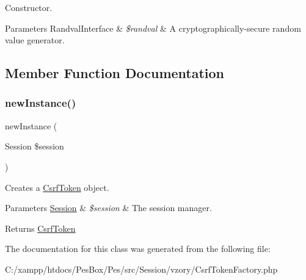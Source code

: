 Constructor.


\begin{DoxyParams}[1]{Parameters}
Randval\+Interface & {\em \$randval} & A cryptographically-\/secure random value generator. \\
\hline
\end{DoxyParams}


\subsection{Member Function Documentation}
\mbox{\label{class_aura_1_1_session_1_1_csrf_token_factory_a130f025e3eab3b75c4707399c0a9e61b}} 
\subsubsection{\texorpdfstring{new\+Instance()}{newInstance()}}
{\footnotesize\ttfamily new\+Instance (\begin{DoxyParamCaption}\item[{Session}]{\$session }\end{DoxyParamCaption})}

Creates a \mbox{\hyperlink{class_aura_1_1_session_1_1_csrf_token}{Csrf\+Token}} object.


\begin{DoxyParams}[1]{Parameters}
\mbox{\hyperlink{namespace_aura_1_1_session}{Session}} & {\em \$session} & The session manager.\\
\hline
\end{DoxyParams}
\begin{DoxyReturn}{Returns}
\mbox{\hyperlink{class_aura_1_1_session_1_1_csrf_token}{Csrf\+Token}} 
\end{DoxyReturn}


The documentation for this class was generated from the following file\+:\begin{DoxyCompactItemize}
\item 
C\+:/xampp/htdocs/\+Pes\+Box/\+Pes/src/\+Session/vzory/Csrf\+Token\+Factory.\+php\end{DoxyCompactItemize}
